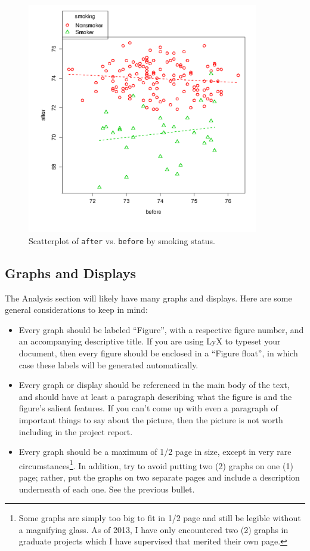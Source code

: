 \documentclass[11pt]{article}
\begin{document}
\begin{figure}[ht]
\centering
\includegraphics[width=0.90\textwidth]{examplefig.pdf}
\caption[A scatterplot]{\label{fig-scatterplot}\small Scatterplot of \texttt{after} vs. \texttt{before} by smoking status.}
\end{figure}

\subsection[Graphs and Displays]{Graphs and Displays}
\label{sec-4-1}

The Analysis section will likely have many graphs and displays. 
Here are some general considerations to keep in mind:

\begin{itemize}
\item Every graph should be labeled ``Figure'', with a respective figure
number, and an accompanying descriptive title. If you are using LyX
to typeset your document, then every figure should be enclosed in a
``Figure float'', in which case these labels will be generated
automatically.
\item Every graph or display should be referenced in the main body of the
text, and should have at least a paragraph describing what the
figure is and the figure's salient features. If you can't come up
with even a paragraph of important things to say about the picture,
then the picture is not worth including in the project report.
\item Every graph should be a maximum of 1/2 page in size, except in very
rare circumstances\footnote{Some graphs are simply too big to fit in 1/2 page and still be
legible without a magnifying glass. As of 2013, I have only
encountered two (2) graphs in graduate projects which I have supervised
that merited their own page.}. In addition, try to avoid putting two (2) graphs
on one (1) page; rather, put the graphs on two separate pages and
include a description underneath of each one. See the previous
bullet.
\end{itemize}
\end{document}
